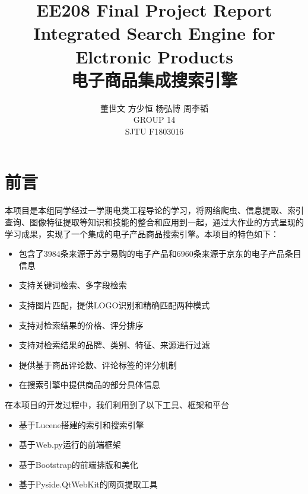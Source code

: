 \documentclass{book}
\begin{document}
\title{EE208 Final Project Report \\ Integrated Search Engine for Elctronic Products \\ 电子商品集成搜索引擎}

\author{董世文 \quad 方少恒 \quad  杨弘博 \quad  周李韬 \\ GROUP 14 \\ SJTU F1803016} %

\maketitle 

\tableofcontents 

\mainmatter %


\frontmatter

\chapter{前言}

本项目是本组同学经过一学期电类工程导论的学习，将网络爬虫、信息提取、索引查询、图像特征提取等知识和技能的整合和应用到一起，通过大作业的方式呈现的学习成果，实现了一个集成的电子产品商品搜索引擎。本项目的特色如下：
\begin{kaishu}
\begin{itemize}
\item 包含了3984条来源于苏宁易购的电子产品和6960条来源于京东的电子产品条目信息
\item 支持关键词检索、多字段检索
\item 支持图片匹配，提供LOGO识别和精确匹配两种模式
\item 支持对检索结果的价格、评分排序
\item 支持对检索结果的品牌、类别、特征、来源进行过滤
\item 提供基于商品评论数、评论标签的评分机制
\item 在搜索引擎中提供商品的部分具体信息
\end{itemize}
\end{kaishu}

在本项目的开发过程中，我们利用到了以下工具、框架和平台
\begin{kaishu}
\begin{itemize}
\item 基于Lucene搭建的索引和搜索引擎
\item 基于Web.py运行的前端框架
\item 基于Bootstrap的前端排版和美化
\item 基于Pyside.QtWebKit的网页提取工具
\end{itemize}
\end{kaishu}
\end{document}
